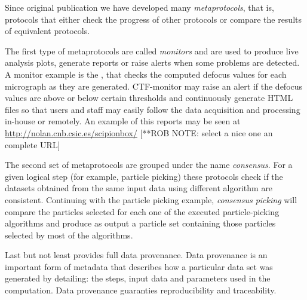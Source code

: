 
Since \scipion original publication we have developed many \emph{metaprotocols}, that is, 
protocols that either check the progress of other protocols or compare the results of equivalent protocols.

The first type of metaprotocols are called \emph{monitors} and are used to produce live analysis plots, generate reports or raise alerts when some problems are detected. A monitor example is the , that checks the computed defocus values for
each micrograph as they are generated. CTF-monitor may raise an alert if the defocus values are above or below certain thresholds and continuously generate HTML files so that users and staff may easily follow the data acquisition and processing in-house or remotely. An example of this reports may be seen at \url{http://nolan.cnb.csic.es/scipionbox/} [**ROB NOTE: select a nice one an complete URL]%

The second set of metaprotocols are grouped under the name \emph{consensus}. For a given logical step (for example, particle picking) these protocols check if the datasets obtained from the same input data using different algorithm are consistent. Continuing with the particle picking example, \emph{consensus picking} will compare the particles selected for each one of the executed particle-picking algorithms and produce as output a particle set containing those particles selected by most of the algorithms.


Last but not least \scipion provides full data provenance. Data provenance is an important form of metadata that describes how a particular data set was generated by detailing: the steps, input data and parameters used in the computation. Data provenance guaranties reproducibility and traceability. %



